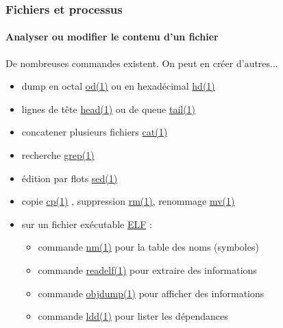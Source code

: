 \documentclass[xcolor=svgnames,final,smaller,a4]{beamer}
\begin{document}
\begin{frame}
  \frametitle{Fichiers et processus}
  \framesubtitle{Analyser ou modifier le contenu d'un fichier}
  
  De nombreuses commandes existent. On peut en créer d'autres...
  \begin{itemize}
    
    \item dump en octal  \href{https://man7.org/linux/man-pages/man1/od.1.html}{od(1)} ou en hexadécimal \href{https://man7.org/linux/man-pages/man1/hd.1.html}{hd(1)} 

    \item lignes de tête \href{https://man7.org/linux/man-pages/man1/head.1.html}{head(1)}  ou de queue \href{https://man7.org/linux/man-pages/man1/tail.1.html}{tail(1)} 

    \item concatener plusieurs fichiers \href{https://man7.org/linux/man-pages/man1/cat.1.html}{cat(1)}
    \item recherche  \href{https://man7.org/linux/man-pages/man1/grep.1.html}{grep(1)}
    \item édition par flots  \href{https://man7.org/linux/man-pages/man1/sed.1.html}{sed(1)}
      
    \item copie \href{https://man7.org/linux/man-pages/man1/cp.1.html}{cp(1)} , suppression \href{https://man7.org/linux/man-pages/man1/rm.1.html}{rm(1)}, renommage \href{https://man7.org/linux/man-pages/man1/mv.1.html}{mv(1)}

    \item sur un fichier exécutable \href{https://fr.wikipedia.org/wiki/Executable_and_Linkable_Format}{ELF} :

      \begin{itemize}
      \item commande  \href{https://man7.org/linux/man-pages/man1/nm.1.html}{nm(1)} pour la table des noms (symboles)

        \item  commande  \href{https://man7.org/linux/man-pages/man1/readelf.1.html}{readelf(1)} pour extraire des informations
        \item  commande  \href{https://man7.org/linux/man-pages/man1/objdump.1.html}{objdump(1)} pour afficher des informations
        \item  commande  \href{https://man7.org/linux/man-pages/man1/ldd.1.html}{ldd(1)} pour lister les dépendances
      \end{itemize}
  \end{itemize}
\end{frame}
      
\end{document}
